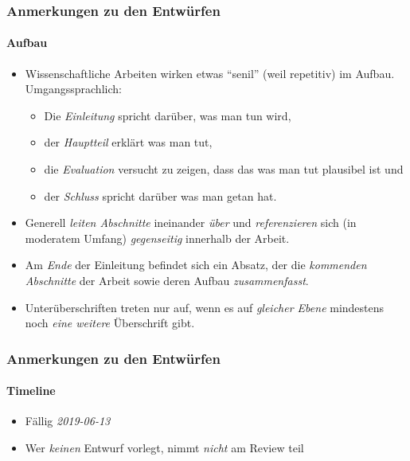 \documentclass{i20lecture}
\begin{document}
\begin{frame}
  \frametitle{Anmerkungen zu den Entwürfen}
  \framesubtitle{Aufbau}

  \begin{itemize}
    \item Wissenschaftliche Arbeiten wirken etwas ``senil'' (weil repetitiv) im
    Aufbau. Umgangssprachlich:
    \begin{itemize}
      \item Die \emph{Einleitung} spricht darüber, was man tun wird,
      \item der \emph{Hauptteil} erklärt was man tut,
      \item die \emph{Evaluation} versucht zu zeigen, dass das was man tut plausibel
      ist und
      \item der \emph{Schluss} spricht darüber was man getan hat.
    \end{itemize}
    
    \item Generell \emph{leiten Abschnitte} ineinander \emph{über} und \emph{referenzieren} sich (in
    moderatem Umfang) \emph{gegenseitig} innerhalb der Arbeit.
    
    \item Am \emph{Ende} der Einleitung befindet sich ein Absatz, der die \emph{kommenden Abschnitte}
    der Arbeit sowie deren Aufbau \emph{zusammenfasst}.
    
    \item Unterüberschriften treten nur auf, wenn es auf \emph{gleicher Ebene} mindestens noch
    \emph{eine weitere} Überschrift gibt.
    
  \end{itemize}
\end{frame}

\begin{frame}
  \frametitle{Anmerkungen zu den Entwürfen}
  \framesubtitle{Timeline}
  
  \begin{itemize}
    \item Fällig \emph{2019-06-13}
    \item Wer \emph{keinen} Entwurf vorlegt, nimmt \emph{nicht} am Review teil
  \end{itemize}
\end{frame}
\end{document}
